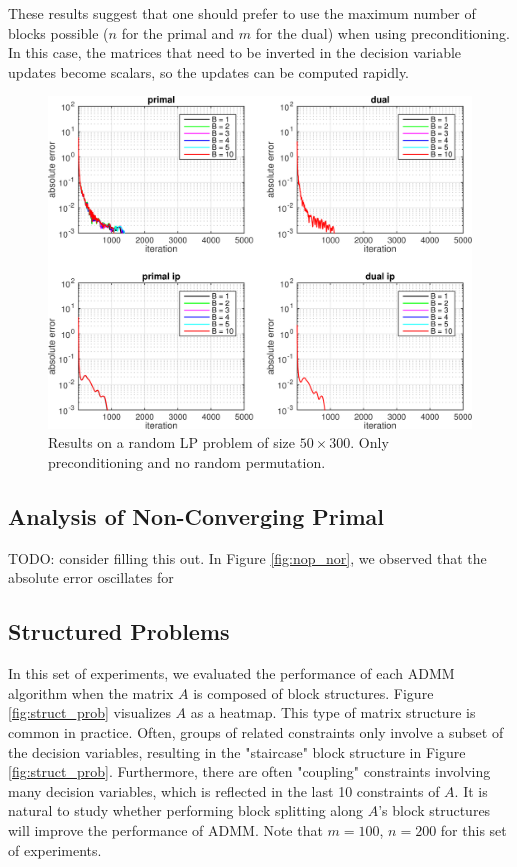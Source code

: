 \documentclass{article}
\begin{document}
{These results suggest that one should prefer to use the maximum number of blocks possible ($n$ for the primal and $m$ for the dual) when using preconditioning. In this case, the matrices that need to be inverted in the decision variable updates become scalars, so the updates can be computed rapidly.
\newline
\newline
\newline
\newline
\begin{figure}[h]
	\includegraphics[width=\textwidth]{../figures/precond_norndperm.png}
	\caption{Results on a random LP problem of size $50 \times 300$. Only preconditioning and no random permutation.}
	\label{fig:p_nor}
\end{figure}

\newpage
\subsection*{Analysis of Non-Converging Primal}
{\color{red} TODO: consider filling this out.}
In Figure \ref{fig:nop_nor}, we observed that the absolute error oscillates for \


\subsection*{Structured Problems}
In this set of experiments, we evaluated the performance of each ADMM algorithm when the matrix $A$ is composed of block structures. Figure \ref{fig:struct_prob} visualizes $A$ as a heatmap. This type of matrix structure is common in practice. Often, groups of related constraints only involve a subset of the decision variables, resulting in the "staircase" block structure in Figure \ref{fig:struct_prob}. Furthermore, there are often "coupling" constraints involving many decision variables, which is reflected in the last 10 constraints of $A$. It is natural to study whether performing block splitting along $A$'s block structures will improve the performance of ADMM. Note that $m=100$, $n=200$ for this set of experiments. 

}
\end{document}
